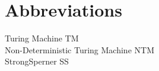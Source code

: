 
\section*{Abbreviations}
\large 
Turing Machine \hfill TM\\
Non-Deterministic Turing Machine \hfill NTM\\
StrongSperner \hfill SS\\

